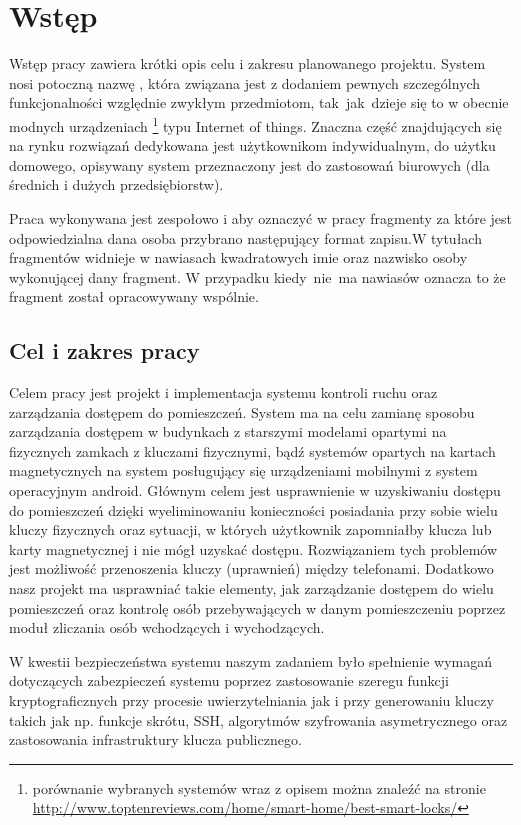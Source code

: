 \newpage\section{Wstęp}\label{sec:wstep}
Wstęp pracy zawiera krótki opis celu i zakresu planowanego projektu. System nosi potoczną nazwę \NazwaSys, która związana jest z dodaniem  pewnych szczególnych funkcjonalności względnie zwykłym przedmiotom, tak~jak~dzieje się to w obecnie modnych urządzeniach \footnote{ porównanie wybranych systemów wraz z opisem można znaleźć na stronie \href{http://www.toptenreviews.com/home/smart-home/best-smart-locks/}{http://www.toptenreviews.com/home/smart-home/best-smart-locks/}} typu Internet of things. Znaczna część znajdujących się na rynku rozwiązań dedykowana jest użytkownikom indywidualnym, do użytku domowego, opisywany system przeznaczony jest do zastosowań biurowych (dla średnich i dużych przedsiębiorstw).

Praca wykonywana jest zespołowo i aby oznaczyć w pracy fragmenty za które jest odpowiedzialna dana osoba przybrano następujący format zapisu.W tytułach fragmentów widnieje w nawiasach kwadratowych imie oraz nazwisko osoby wykonującej dany fragment. W przypadku kiedy~nie~ma nawiasów oznacza to że fragment został opracowywany wspólnie.

\subsection{Cel i zakres pracy}

Celem pracy jest projekt i implementacja systemu kontroli ruchu oraz zarządzania dostępem do pomieszczeń. System ma na celu zamianę sposobu zarządzania dostępem w budynkach z starszymi modelami opartymi na fizycznych zamkach z kluczami fizycznymi, bądź systemów opartych na kartach magnetycznych na system posługujący się urządzeniami mobilnymi z system operacyjnym android. Głównym celem jest usprawnienie w uzyskiwaniu dostępu do pomieszczeń dzięki wyeliminowaniu konieczności posiadania przy sobie wielu kluczy fizycznych oraz sytuacji, w których użytkownik zapomniałby klucza lub karty magnetycznej i nie mógł uzyskać dostępu. Rozwiązaniem tych problemów jest możliwość przenoszenia kluczy (uprawnień) między telefonami. Dodatkowo nasz projekt ma usprawniać takie elementy, jak zarządzanie dostępem do wielu pomieszczeń oraz kontrolę osób przebywających w danym pomieszczeniu poprzez moduł zliczania osób wchodzących i wychodzących.
	
W kwestii bezpieczeństwa systemu naszym zadaniem było spełnienie wymagań dotyczących zabezpieczeń systemu poprzez zastosowanie szeregu funkcji kryptograficznych przy procesie uwierzytelniania jak i przy generowaniu kluczy takich jak np. funkcje skrótu, SSH, algorytmów szyfrowania asymetrycznego oraz zastosowania infrastruktury klucza publicznego.


